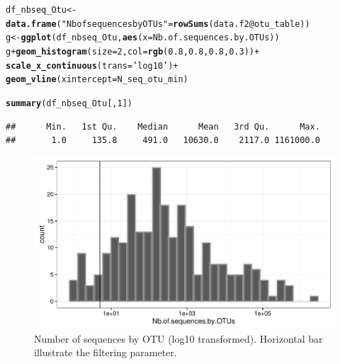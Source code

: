 \documentclass[12pt]{article}\usepackage[]{graphicx}\usepackage[]{color}
\makeatletter
\def\maxwidth{ %
  \ifdim\Gin@nat@width>\linewidth
    \linewidth
  \else
    \Gin@nat@width
  \fi
}
\newcommand{\hlnum}[1]{\textcolor[rgb]{0.686,0.059,0.569}{#1}}%
\newcommand{\hlstr}[1]{\textcolor[rgb]{0.192,0.494,0.8}{#1}}%
\newcommand{\hlopt}[1]{\textcolor[rgb]{0,0,0}{#1}}%
\newcommand{\hlstd}[1]{\textcolor[rgb]{0.345,0.345,0.345}{#1}}%
\newcommand{\hlkwb}[1]{\textcolor[rgb]{0.69,0.353,0.396}{#1}}%
\newcommand{\hlkwc}[1]{\textcolor[rgb]{0.333,0.667,0.333}{#1}}%
\newcommand{\hlkwd}[1]{\textcolor[rgb]{0.737,0.353,0.396}{\textbf{#1}}}%
\newenvironment{kframe}{%
 \def\at@end@of@kframe{}%
 \ifinner\ifhmode%
  \def\at@end@of@kframe{\end{minipage}}%
  \begin{minipage}{\columnwidth}%
 \fi\fi%
 \def\FrameCommand##1{\hskip\@totalleftmargin \hskip-\fboxsep
 \colorbox{shadecolor}{##1}\hskip-\fboxsep
     \hskip-\linewidth \hskip-\@totalleftmargin \hskip\columnwidth}%
 \MakeFramed {\advance\hsize-\width
   \@totalleftmargin\z@ \linewidth\hsize
   \@setminipage}}%
 {\par\unskip\endMakeFramed%
 \at@end@of@kframe}
\newenvironment{knitrout}{}{} %
\numberwithin{figure}{section}
\makeatother
\begin{document}
\begin{knitrout}\small
{}\color{fgcolor}\begin{kframe}
\begin{alltt}
\hlstd{df_nbseq_Otu} \hlkwb{<-} \hlkwd{data.frame}\hlstd{(}\hlstr{"Nb of sequences by OTUs"} \hlstd{=} \hlkwd{rowSums}\hlstd{(data.f2}\hlopt{@}\hlkwc{otu_table}\hlstd{))}
\hlstd{g} \hlkwb{<-} \hlkwd{ggplot}\hlstd{(df_nbseq_Otu,} \hlkwd{aes}\hlstd{(}\hlkwc{x} \hlstd{= Nb.of.sequences.by.OTUs))}
\hlstd{g} \hlopt{+} \hlkwd{geom_histogram}\hlstd{(}\hlkwc{size} \hlstd{=} \hlnum{2}\hlstd{,} \hlkwc{col} \hlstd{=} \hlkwd{rgb}\hlstd{(}\hlnum{0.8}\hlstd{,} \hlnum{0.8}\hlstd{,} \hlnum{0.8}\hlstd{,} \hlnum{0.3}\hlstd{))} \hlopt{+}
  \hlkwd{scale_x_continuous}\hlstd{(}\hlkwc{trans} \hlstd{=} \hlstr{'log10'}\hlstd{)} \hlopt{+}
  \hlkwd{geom_vline}\hlstd{(}\hlkwc{xintercept}\hlstd{= N_seq_otu_min)}
\end{alltt}


{\ttfamily\noindent\itshape\color{messagecolor}{\#\# `stat\_bin()` using `bins = 30`. Pick better value with `binwidth`.}}\begin{alltt}
\hlkwd{summary}\hlstd{(df_nbseq_Otu[,} \hlnum{1}\hlstd{])}
\end{alltt}
\begin{verbatim}
##      Min.   1st Qu.    Median      Mean   3rd Qu.      Max. 
##       1.0     135.8     491.0   10630.0    2117.0 1161000.0
\end{verbatim}
\end{kframe}\begin{figure}

{\centering \includegraphics[width=\maxwidth]{figure/nbseq_Otu-1} 

}

\caption[Number of sequences by OTU (log10 transformed)]{Number of sequences by OTU (log10 transformed). Horizontal bar illustrate the filtering parameter.}\label{fig:nbseq_Otu}
\end{figure}


\end{knitrout}
\end{document}
